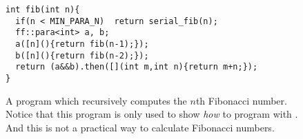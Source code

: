 \begin{figure}
  \centering
\begin{lstlisting}[mathescape]
int fib(int n){
  if(n < MIN_PARA_N)  return serial_fib(n);
  ff::para<int> a, b;
  a([n](){return fib(n-1);});
  b([n](){return fib(n-2);});
  return (a&&b).then([](int m,int n){return m+n;});
}
\end{lstlisting}
\caption{A {\fname} program which recursively computes the \(n\)th Fibonacci
    number. Notice that this program is only used to show {\it how} to
    program with {\name}. And this is not a practical way to
    calculate Fibonacci numbers.}
\label{fig:overview}
\end{figure}

